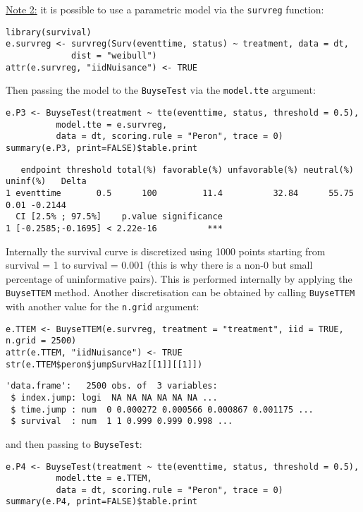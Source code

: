 \documentclass[12pt]{article}
\begin{document}
\uline{Note 2:} it is possible to use a parametric model via the \texttt{survreg} function:
\lstset{language=r,label= ,caption= ,captionpos=b,numbers=none}
\begin{lstlisting}
library(survival)
e.survreg <- survreg(Surv(eventtime, status) ~ treatment, data = dt, 
		     dist = "weibull")
attr(e.survreg, "iidNuisance") <- TRUE
\end{lstlisting}
Then passing the model to the \texttt{BuyseTest} via the \texttt{model.tte} argument:
\lstset{language=r,label= ,caption= ,captionpos=b,numbers=none}
\begin{lstlisting}
e.P3 <- BuyseTest(treatment ~ tte(eventtime, status, threshold = 0.5),
		  model.tte = e.survreg,
		  data = dt, scoring.rule = "Peron", trace = 0)
summary(e.P3, print=FALSE)$table.print
\end{lstlisting}
\begin{verbatim}
   endpoint threshold total(%) favorable(%) unfavorable(%) neutral(%) uninf(%)   Delta
1 eventtime       0.5      100         11.4          32.84      55.75     0.01 -0.2144
  CI [2.5% ; 97.5%]    p.value significance
1 [-0.2585;-0.1695] < 2.22e-16          ***
\end{verbatim}

Internally the survival curve is discretized using 1000 points
starting from survival = 1 to survival = 0.001 (this is why there is a
non-0 but small percentage of uninformative pairs). This is performed
internally by applying the \texttt{BuyseTTEM} method. Another discretisation
can be obtained by calling \texttt{BuyseTTEM} with another value for the \texttt{n.grid} argument:
\lstset{language=r,label= ,caption= ,captionpos=b,numbers=none}
\begin{lstlisting}
e.TTEM <- BuyseTTEM(e.survreg, treatment = "treatment", iid = TRUE, n.grid = 2500)
attr(e.TTEM, "iidNuisance") <- TRUE
str(e.TTEM$peron$jumpSurvHaz[[1]][[1]])
\end{lstlisting}

\begin{verbatim}
'data.frame':	2500 obs. of  3 variables:
 $ index.jump: logi  NA NA NA NA NA NA ...
 $ time.jump : num  0 0.000272 0.000566 0.000867 0.001175 ...
 $ survival  : num  1 1 0.999 0.999 0.998 ...
\end{verbatim}

and then passing to \texttt{BuyseTest}:
\lstset{language=r,label= ,caption= ,captionpos=b,numbers=none}
\begin{lstlisting}
e.P4 <- BuyseTest(treatment ~ tte(eventtime, status, threshold = 0.5),
		  model.tte = e.TTEM,
		  data = dt, scoring.rule = "Peron", trace = 0)
summary(e.P4, print=FALSE)$table.print
\end{lstlisting}
\end{document}
